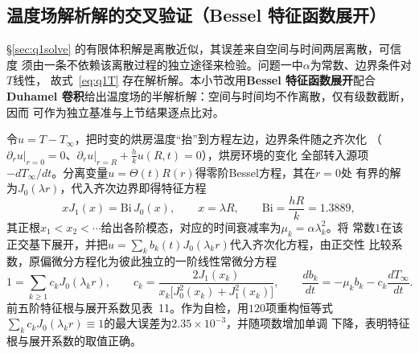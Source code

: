 \documentclass[withoutpreface,bwprint]{cumcmthesis} %
\begin{document}
\newpage
\begin{appendices}

\section{温度场解析解的交叉验证（Bessel 特征函数展开）}
\label{app:tempverify}

\S\ref{sec:q1solve} 的有限体积解是离散近似，其误差来自空间与时间两层离散，可信度
须由一条不依赖该离散过程的独立途径来检验。问题一中$\alpha$为常数、边界条件对$T$线性，
故式~\eqref{eq:q1T} 存在解析解。本小节改用\textbf{Bessel 特征函数展开}配合
\textbf{Duhamel 卷积}给出温度场的半解析解：空间与时间均不作离散，仅有级数截断，因而
可作为独立基准与上节结果逐点比对。

令$u=T-T_\infty$，把时变的烘房温度``抬''到方程左边，边界条件随之齐次化
（$\partial_r u|_{r=0}=0$、$\partial_r u|_{r=R}+\frac hk u(R,t)=0$），烘房环境的变化
全部转入源项$-dT_\infty/dt$。分离变量$u=\Theta(t)R(r)$得零阶Bessel方程，其在$r=0$处
有界的解为$J_0(\lambda r)$，代入齐次边界即得特征方程
\begin{equation}
\label{eq:eigen}
xJ_1(x)=\mathrm{Bi}\,J_0(x),\qquad x=\lambda R,\qquad
\mathrm{Bi}=\frac{hR}{k}=1.3889,
\end{equation}
其正根$x_1<x_2<\cdots$给出各阶模态，对应的时间衰减率为$\mu_k=\alpha\lambda_k^2$。将
常数$1$在该正交基下展开，并把$u=\sum_kb_k(t)J_0(\lambda_kr)$代入齐次化方程，由正交性
比较系数，原偏微分方程化为彼此独立的一阶线性常微分方程
\begin{equation}
\label{eq:mode}
1=\sum_{k\ge1}c_kJ_0(\lambda_kr),\qquad
c_k=\frac{2J_1(x_k)}{x_k\bigl[J_0^2(x_k)+J_1^2(x_k)\bigr]},\qquad
\frac{db_k}{dt}=-\mu_kb_k-c_k\frac{dT_\infty}{dt}.
\end{equation}
前五阶特征根与展开系数见表~11。作为自检，用$120$项重构恒等式
$\sum_kc_kJ_0(\lambda_kr)\equiv1$的最大误差为$2.35\times10^{-3}$，并随项数增加单调
下降，表明特征根与展开系数的取值正确。


\end{appendices}
\end{document}
